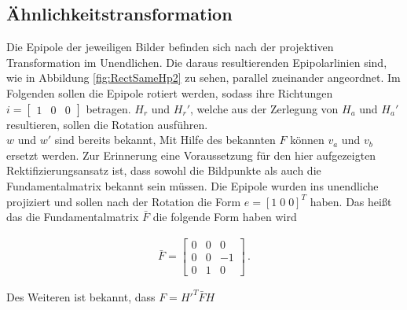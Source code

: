 \subsection{Ähnlichkeitstransformation}



Die Epipole der jeweiligen Bilder befinden sich nach der projektiven Transformation im Unendlichen. Die daraus resultierenden Epipolarlinien sind, wie in Abbildung \ref{fig:RectSameHp2} zu sehen, parallel zueinander angeordnet. Im Folgenden sollen die Epipole rotiert werden, sodass ihre Richtungen $i = \begin{bmatrix}1&0&0\end{bmatrix}$ betragen. $H_r$ und $H_r'$, welche aus der Zerlegung von $H_a$ und $H_a'$ resultieren, sollen die Rotation ausführen.\\

$w$ und $w'$ sind bereits bekannt, Mit Hilfe des bekannten $F$ können $v_a$ und $v_b$ ersetzt werden. Zur Erinnerung eine Voraussetzung für den hier aufgezeigten Rektifizierungsansatz ist, dass sowohl die Bildpunkte als auch die Fundamentalmatrix bekannt sein müssen. Die Epipole wurden ins unendliche projiziert und sollen nach der Rotation die Form $e = [1 \;0\;0]^T$ haben. Das heißt das die Fundamentalmatrix $\bar{F}$ die folgende Form haben wird

\begin{gather}
	\bar{F} = \begin{bmatrix}
		0&0&0\\
		0&0&-1\\
		0&1&0
	\end{bmatrix} \, .
\end{gather} 

Des Weiteren ist bekannt, dass $F = H'^T \bar{F} H$ 


